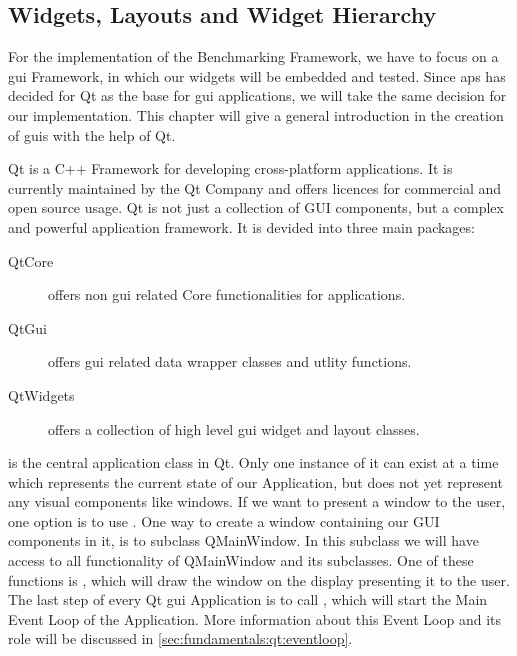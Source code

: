 
\subsection{Widgets, Layouts and Widget Hierarchy}
\label{sec:fundamentals:qt:basics}

For the implementation of the Benchmarking Framework, we have to focus on a
\gls{gui} Framework, in which our widgets will be embedded and tested. Since
\gls{aps} has decided for Qt as the base for \gls{gui} applications, we will
take the same decision for our implementation. This chapter will give a general
introduction in the creation of \glspl{gui} with the help of Qt.

Qt is a C++ Framework for developing cross-platform applications. It is
currently maintained by the Qt Company and offers licences for commercial and
open source usage. Qt is not just a collection of GUI components, but a complex
and powerful application framework. It is devided into three main packages:

\begin{description}
    
    \item[QtCore] offers non \gls{gui} related Core functionalities for
        applications.  

    \item[QtGui] offers \gls{gui} related data wrapper
        classes and utlity functions.
    
    \item[QtWidgets] offers a collection of high level \gls{gui} widget and
        layout classes.  

\end{description}

 is the central application class in
Qt. Only one instance of it can exist at a time which represents the current
state of our Application, but does not yet represent any visual components like
windows. If we want to present a window to the user, one option is to use
. One way to create a window
containing our GUI components in it, is to subclass QMainWindow. In this
subclass we will have access to all functionality of QMainWindow and its
subclasses. One of these functions is
, which will draw the window on the
display presenting it to the user. The last step of every Qt \gls{gui}
Application is to call , which
will start the Main Event Loop of the Application. More information about this
Event Loop and its role will be discussed in
\ref{sec:fundamentals:qt:eventloop}.

